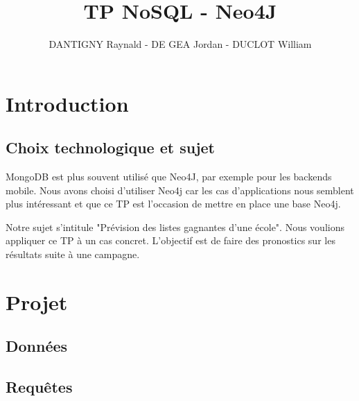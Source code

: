 \documentclass[a4paper,oneside,1pt]{article}
\title{TP NoSQL - Neo4J}
\author{DANTIGNY Raynald - DE GEA Jordan - DUCLOT William}
\begin{document}




\maketitle

\section{Introduction}

\subsection{Choix technologique et sujet}

MongoDB est plus souvent utilisé que Neo4J, par exemple pour les backends mobile. Nous avons choisi d'utiliser Neo4j car les cas d'applications nous semblent plus intéressant et que ce TP est l'occasion de mettre en place une base Neo4j. \\
\linebreak

Notre sujet s'intitule "Prévision des listes gagnantes d'une école". Nous voulions appliquer ce TP à un cas concret. L'objectif est de faire des pronostics sur les résultats suite à une campagne. 

\section{Projet}

\subsection{Données}


\subsection{Requêtes}

\end{document}
